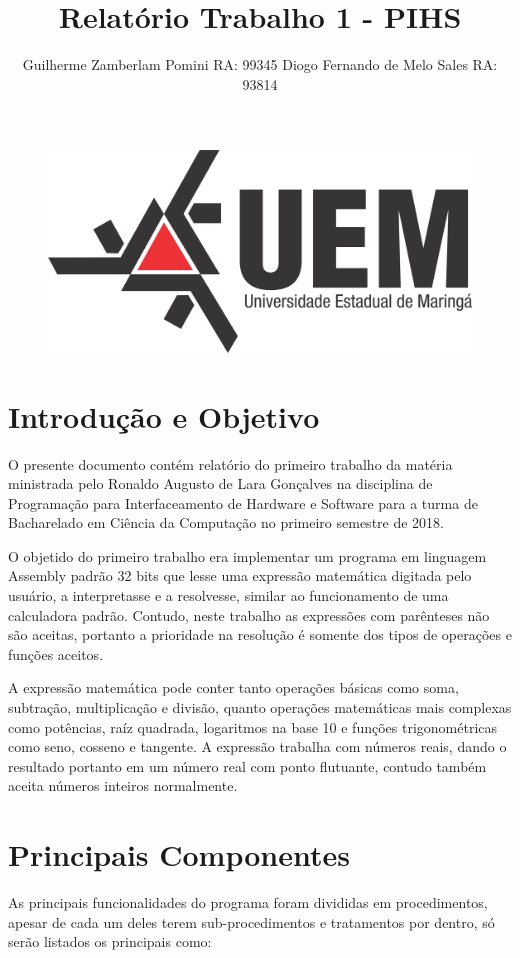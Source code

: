\documentclass[12pt]{article}
\title{Relatório Trabalho 1 - PIHS}
\author{Guilherme Zamberlam Pomini  RA: 99345\inst{1} Diogo Fernando de Melo Sales RA: 93814 \inst{1}}
\begin{document}
 

\maketitle

\begin{figure}[H]
\centering
\includegraphics[width=.5\textwidth]{Imagens/logo.png}
\end{figure}


\section*{Introdução e Objetivo}

O presente documento contém relatório do primeiro trabalho da matéria ministrada pelo Ronaldo Augusto de Lara Gonçalves na disciplina de Programação para Interfaceamento de Hardware e Software para a turma de Bacharelado em Ciência da Computação no primeiro semestre de 2018.

O objetido do primeiro trabalho era implementar um programa em linguagem Assembly padrão 32 bits que lesse uma expressão matemática digitada pelo usuário, a interpretasse e a resolvesse, similar ao funcionamento de uma calculadora padrão. Contudo, neste trabalho as expressões com parênteses não são aceitas, portanto a prioridade na resolução é somente dos tipos de operações e funções aceitos.

A expressão matemática pode conter tanto operações básicas como soma, subtração, multiplicação e divisão, quanto operações matemáticas mais complexas como potências, raíz quadrada, logaritmos na base 10 e funções trigonométricas como seno, cosseno e tangente. A expressão trabalha com números reais, dando o resultado portanto em um número real com ponto flutuante, contudo também aceita números inteiros normalmente.

\section*{Principais Componentes}

As principais funcionalidades do programa foram divididas em procedimentos, apesar de cada um deles terem sub-procedimentos e tratamentos por dentro, só serão listados os principais como:
\end{document}
